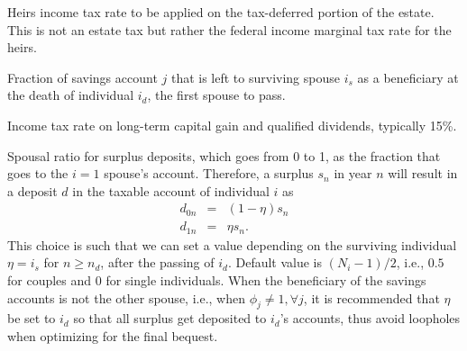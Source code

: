 \documentclass{report}[fleqn,11pt]
\begin{document}
\begin{description}[leftmargin=4em,style=multiline]
\item [$\nu$]
	Heirs income tax rate to be applied on the tax-deferred portion of the estate. This is not an estate tax
	but rather the federal income marginal tax rate for the heirs.
\item [$\phi_j$]
	Fraction of savings account $j$ that is left to surviving spouse $i_s$ as a beneficiary
	at the death of individual $i_d$, the first spouse to pass.
\item [$\psi$]
	Income tax rate on long-term capital gain and qualified dividends, typically 15\%.
\item [$\eta$]
	Spousal ratio for surplus deposits, which goes from 0 to 1, as the fraction
	that goes to the $i = 1$ spouse's account. Therefore, a surplus $s_n$ in year $n$
	will result in a deposit $d$ in the taxable account of individual $i$ as
	\begin{eqnarray}
		\label{Eq:eta}
		d_{0n} & = & (1 - \eta) s_n \nonumber\\
		d_{1n} & = & \eta s_n.
	\end{eqnarray}
	This choice is such that we can set a value depending on the surviving
	individual $\eta = i_s$ for $n \ge n_d$, after the passing of $i_d$.
	Default value is $(N_i - 1)/2$, i.e., $0.5$ for couples and $0$ for single individuals.
	When the beneficiary of the savings accounts is not the other spouse, i.e., 
	when $\phi_j \neq 1, \forall j$, it is recommended that $\eta$ be set to $i_d$ so that
	all surplus get deposited to $i_d$'s accounts,
	thus avoid loopholes when optimizing for the final bequest.

\end{description}
\end{document}

